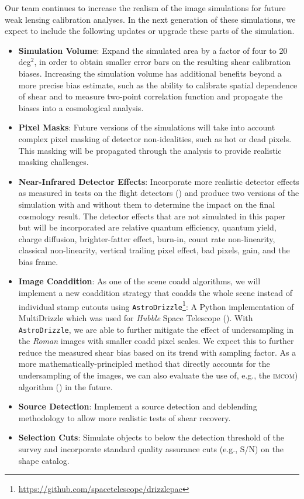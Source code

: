 \documentclass[fleqn,usenatbib]{mnras}
\begin{document}
Our team continues to increase the realism of the image simulations for future weak lensing calibration analyses. In the next generation of these simulations, we expect to include the following updates or upgrade these parts of the simulation. 
\begin{itemize}
    \setlength\itemsep{1em}
    \item \textbf{Simulation Volume}: Expand the simulated area by a factor of four to 20 \textrm{deg}$^{2}$, in order to obtain smaller error bars on the resulting shear calibration biases. Increasing the simulation volume has additional benefits beyond a more precise bias estimate, such as the ability to calibrate spatial dependence of shear and to measure two-point correlation function and propagate the biases into a cosmological analysis.
    
    \item \textbf{Pixel Masks}: Future versions of the simulations will take into account complex pixel masking of detector non-idealities, such as hot or dead pixels. This masking will be propagated through the analysis to provide realistic masking challenges. 
    
    \item \textbf{Near-Infrared Detector Effects}: Incorporate more realistic detector effects as measured in tests on the flight detectors (\citealt{2020JATIS...6d6001M}) and produce two versions of the simulation with and without them to determine the impact on the final cosmology result. The detector effects that are not simulated in this paper but will be incorporated are relative quantum efficiency, quantum yield, charge diffusion, brighter-fatter effect, burn-in, count rate non-linearity, classical non-linearity, vertical trailing pixel effect, bad pixels, gain, and the bias frame.
    
    \item \textbf{Image Coaddition}: As one of the scene coadd algorithms, we will implement a new coaddition strategy that coadds the whole scene instead of individual stamp cutouts using  \texttt{AstroDrizzle}\footnote{\url{https://github.com/spacetelescope/drizzlepac}}: A Python implementation of MultiDrizzle which was used for \emph{Hubble} Space Telescope (\citealt{2003hstc.conf..325B}). With \texttt{AstroDrizzle}, we are able to further mitigate the effect of undersampling in the \emph{Roman} images with smaller coadd pixel scales. We expect this to further reduce the measured shear bias based on its trend with sampling factor. As a more mathematically-principled method that directly accounts for the undersampling of the images, we can also evaluate the use of, e.g., the \textsc{imcom}) algorithm (\citealt{2011ApJ...741...46R}) in the future.
    
    \item \textbf{Source Detection}: Implement a source detection and deblending methodology to allow more realistic tests of shear recovery.
    
    \item \textbf{Selection Cuts}: Simulate objects to below the detection threshold of the survey and incorporate standard quality assurance cuts (e.g., S/N) on the shape catalog. 
\end{itemize}
\end{document}
